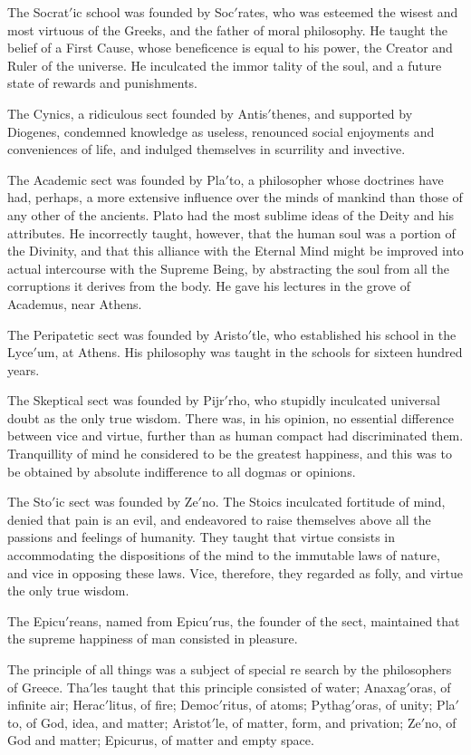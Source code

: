 \documentclass[openany,a4paper]{memoir}
\begin{document}
The Socrat$'$ic school was founded by Soc$'$rates, who was 
esteemed the wisest and most virtuous of the Greeks, and 
the father of moral philosophy. He taught the belief of a 
First Cause, whose beneficence is equal to his power, the Creator and Ruler of the universe. He inculcated the immor
tality of the soul, and a future state of rewards and punishments. 

The Cynics, a ridiculous sect founded by Antis$'$thenes, and 
supported by Diogenes, condemned knowledge as useless, renounced social enjoyments and conveniences of life, and indulged themselves in scurrility and invective. 

The Academic sect was founded by Pla$'$to, a philosopher 
whose doctrines have had, perhaps, a more extensive influence 
over the minds of mankind than those of any other of the 
ancients. Plato had the most sublime ideas of the Deity and 
his attributes. He incorrectly taught, however, that the 
human soul was a portion of the Divinity, and that this alliance with the Eternal Mind might be improved into actual 
intercourse with the Supreme Being, by abstracting the soul 
from all the corruptions it derives from the body. He gave 
his lectures in the grove of Academus, near Athens. 

The Peripatetic sect was founded by Aristo$'$tle, who established his school in the Lyce$'$um, at Athens. His philosophy was taught in the schools for sixteen hundred years. 

The Skeptical sect was founded by Pijr$'$rho, who stupidly 
inculcated universal doubt as the only true wisdom. There 
was, in his opinion, no essential difference between vice and 
virtue, further than as human compact had discriminated 
them. Tranquillity of mind he considered to be the greatest 
happiness, and this was to be obtained by absolute indifference to all dogmas or opinions. 

The Sto$'$ic sect was founded by Ze$'$no. The Stoics inculcated fortitude of mind, denied that pain is an evil, and endeavored to raise themselves above all the passions and 
feelings of humanity. They taught that virtue consists in 
accommodating the dispositions of the mind to the immutable laws of nature, and vice in opposing these laws. Vice, 
therefore, they regarded as folly, and virtue the only true 
wisdom. 

The Epicu$'$reans, named from Epicu$'$rus, the founder of 
the sect, maintained that the supreme happiness of man consisted in pleasure. 

The principle of all things was a subject of special re
search by the philosophers of Greece. Tha$'$les taught that 
this principle consisted of water; Anaxag$'$oras, of infinite 
air; Herac$'$litus, of fire; Democ$'$ritus, of atoms; Pythag$'$oras, of unity; Pla$'$to, of God, idea, and matter; Aristot$'$le, of 
matter, form, and privation; Ze$'$no, of God and matter; Epicurus, of matter and empty space. 
\end{document}
